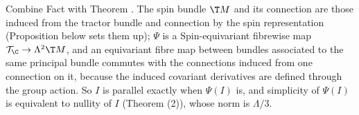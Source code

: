 Combine Fact  with Theorem . The spin bundle $\T M$ and its connection are those induced from the tractor bundle and connection by the spin representation (Proposition  below sets them up); $\Psi$ is a $\mathrm{Spin}$-equivariant fibrewise map $\mathcal{T}_\C \to \Lambda^2\T M$, and an equivariant fibre map between bundles associated to the same principal bundle commutes with the connections induced from one connection on it, because the induced covariant derivatives are defined through the group action. So $I$ is parallel exactly when $\Psi(I)$ is, and simplicity of $\Psi(I)$ is equivalent to nullity of $I$ (Theorem (2)), whose norm is $\Lambda/3$.
